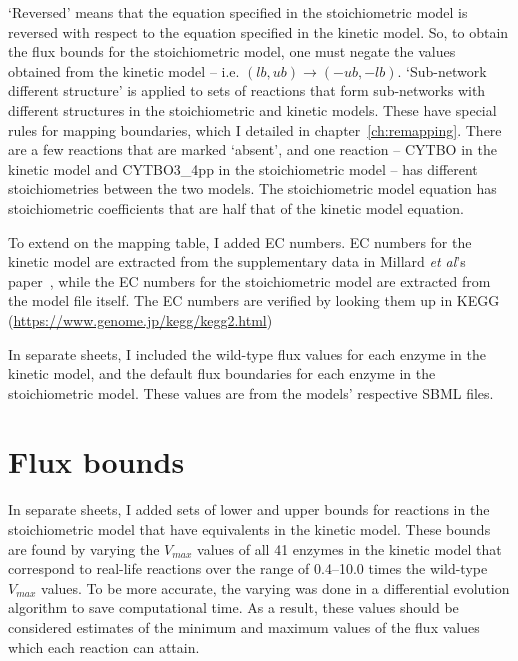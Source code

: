 \documentclass[parskip=full]{scrreprt}
\begin{document}
`Reversed' means that the equation specified in the stoichiometric model is reversed with respect to the equation specified in the kinetic model. So, to obtain the flux bounds for the stoichiometric model, one must negate the values obtained from the kinetic model -- i.e. $(lb, ub) \rightarrow (-ub, -lb)$. `Sub-network different structure' is applied to sets of reactions that form sub-networks with different structures in the stoichiometric and kinetic models. These have special rules for mapping boundaries, which I detailed in chapter~\vref{ch:remapping}. There are a few reactions that are marked `absent', and one reaction -- CYTBO in the kinetic model and CYTBO3\_4pp in the stoichiometric model -- has different stoichiometries between the two models. The stoichiometric model equation has stoichiometric coefficients that are half that of the kinetic model equation.

To extend on the mapping table, I added EC numbers. EC numbers for the kinetic model are extracted from the supplementary data in Millard \emph{et al}'s paper~\cite{millard_metabolic_2017}, while the EC numbers for the stoichiometric model are extracted from the model file itself. The EC numbers are verified by looking them up in KEGG (\url{https://www.genome.jp/kegg/kegg2.html})

In separate sheets, I included the wild-type flux values for each enzyme in the kinetic model, and the default flux boundaries for each enzyme in the stoichiometric model. These values are from the models' respective SBML files.

\chapter{Flux bounds}
\label{ch:fluxbounds}

In separate sheets, I added sets of lower and upper bounds for reactions in the stoichiometric model that have equivalents in the kinetic model. These bounds are found by varying the $V_{max}$ values of all 41 enzymes in the kinetic model that correspond to real-life reactions over the range of 0.4--10.0 times the wild-type $V_{max}$ values. To be more accurate, the varying was done in a differential evolution algorithm to save computational time. As a result, these values should be considered estimates of the minimum and maximum values of the flux values which each reaction can attain.




\end{document}
